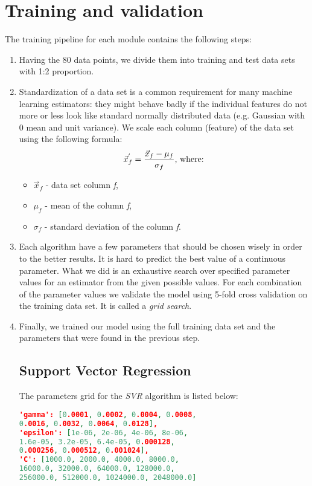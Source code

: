 \section{Training and validation}
The training pipeline for each module contains the following steps:
\begin{enumerate}
	\item Having the 80 data points, we divide them into training and test data sets with 1:2 proportion.
	\item Standardization of a data set is a common requirement for many machine learning estimators: they might behave badly if the individual features do not more or less look like standard normally distributed data (e.g. Gaussian with 0 mean and unit variance)\cite{scaler}. We scale each column (feature) of the data set using the following formula:
	\[ \vec{x}_{f}^{'} = \frac{\vec{x}_{f}-\mu_f}{\sigma_f} \textnormal{, where:}\]
	\begin{itemize}
		\item $ \vec{x}_{f} $ - data set column \textit{f},
		\item $ \mu_f $ - mean of the column \textit{f},
		\item $ \sigma_f $ - standard deviation of the column \textit{f}.
	\end{itemize}
	\item Each algorithm have a few parameters that should be chosen wisely in order to the better results. It is hard to predict the best value of a continuous parameter. What we did is an exhaustive search over specified parameter values for an estimator from the given possible values. For each combination of the parameter values we validate the model using 5-fold cross validation on the training data set. It is called a \textit{grid search}\cite{grid_search}.
	\item Finally, we trained our model using the full training data set and the parameters that were found in the previous step.
	\subsection{Support Vector Regression}
	The parameters grid for the \textit{SVR} algorithm is listed below:
	\begin{lstlisting}[language=json,firstnumber=1]
'gamma': [0.0001, 0.0002, 0.0004, 0.0008, 
0.0016, 0.0032, 0.0064, 0.0128], 
'epsilon': [1e-06, 2e-06, 4e-06, 8e-06, 
1.6e-05, 3.2e-05, 6.4e-05, 0.000128, 
0.000256, 0.000512, 0.001024], 
'C': [1000.0, 2000.0, 4000.0, 8000.0,
16000.0, 32000.0, 64000.0, 128000.0, 
256000.0, 512000.0, 1024000.0, 2048000.0]
	\end{lstlisting}
	

\end{enumerate}

